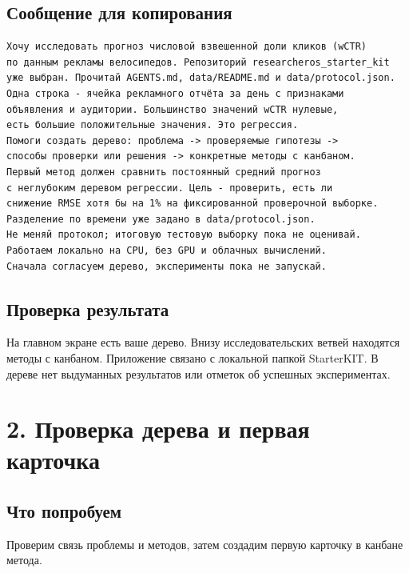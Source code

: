 \documentclass[10pt,a4paper]{article}
\begin{document}
\subsection*{Сообщение для копирования}
\begin{promptbox}
\begin{Verbatim}
Хочу исследовать прогноз числовой взвешенной доли кликов (wCTR)
по данным рекламы велосипедов. Репозиторий researcheros_starter_kit
уже выбран. Прочитай AGENTS.md, data/README.md и data/protocol.json.
Одна строка - ячейка рекламного отчёта за день с признаками
объявления и аудитории. Большинство значений wCTR нулевые,
есть большие положительные значения. Это регрессия.
Помоги создать дерево: проблема -> проверяемые гипотезы ->
способы проверки или решения -> конкретные методы с канбаном.
Первый метод должен сравнить постоянный средний прогноз
с неглубоким деревом регрессии. Цель - проверить, есть ли
снижение RMSE хотя бы на 1% на фиксированной проверочной выборке.
Разделение по времени уже задано в data/protocol.json.
Не меняй протокол; итоговую тестовую выборку пока не оценивай.
Работаем локально на CPU, без GPU и облачных вычислений.
Сначала согласуем дерево, эксперименты пока не запускай.
\end{Verbatim}
\end{promptbox}
\subsection*{Проверка результата}
На главном экране есть ваше дерево. Внизу исследовательских ветвей находятся методы с канбаном. Приложение связано с локальной папкой StarterKIT. В дереве нет выдуманных результатов или отметок об успешных экспериментах.


\clearpage
\section{2. Проверка дерева и первая карточка}
\subsection*{Что попробуем}
Проверим связь проблемы и методов, затем создадим первую карточку в канбане метода.
\end{document}
